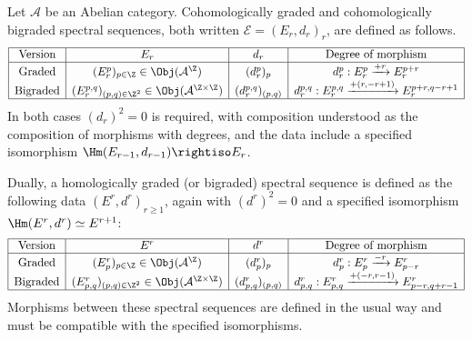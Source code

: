 \begin{definition}
\label{def:graded-spectral-sequence}
	Let $\mathcal{A}$ be an Abelian category. Cohomologically graded and
	cohomologically bigraded spectral sequences, both written
	$\mathscr{E}=(E_r,d_r)_r$, are defined as follows.
	\[\begin{array}{|c|c|c|c|} \hline
		\text{Version} & E_r & d_r & \text{Degree of morphism} \\ \hline
		\text{Graded} & (E_r^p)_{p\in\Z}\in\Obj(\mathcal{A}^{\Z})
		& (d_r^p)_p & d_r^p:E_r^p\xrightarrow{+r}E_r^{p+r} \\
		\text{Bigraded} &
		(E_r^{p,q})_{(p,q)\in\Z^2}\in\Obj(\mathcal{A}^{\Z\times\Z})
		& (d_r^{p,q})_{(p,q)} &
		d_r^{p,q}:E_r^{p,q}\xrightarrow{+(r,-r+1)}E_r^{p+r,q-r+1}
		\\ \hline
	\end{array}\]
	In both cases $(d_r)^2=0$ is required, with composition understood as the
	composition of morphisms with degrees, and the data include a specified
	isomorphism $\Hm(E_{r-1},d_{r-1})\rightiso E_r$.

	Dually, a homologically graded (or bigraded) spectral sequence is defined as
	the following data $(E^r,d^r)_{r\geq1}$, again with $(d^r)^2=0$ and a
	specified isomorphism $\Hm(E^r,d^r)\simeq E^{r+1}$:
	\[\begin{array}{|c|c|c|c|} \hline
		\text{Version} & E^r & d^r & \text{Degree of morphism} \\ \hline
		\text{Graded} & (E^r_p)_{p\in\Z}\in\Obj(\mathcal{A}^{\Z})
		& (d^r_p)_p & d^r_p:E^r_p\xrightarrow{-r}E^r_{p-r} \\
		\text{Bigraded} &
		(E^r_{p,q})_{(p,q)\in\Z^2}\in\Obj(\mathcal{A}^{\Z\times\Z})
		& (d^r_{p,q})_{(p,q)} &
		d^r_{p,q}:E^r_{p,q}\xrightarrow{+(-r,r-1)}E^r_{p-r,q+r-1}
		\\ \hline
	\end{array}\]
	Morphisms between these spectral sequences are defined in the usual way and
	must be compatible with the specified isomorphisms.
\end{definition}

